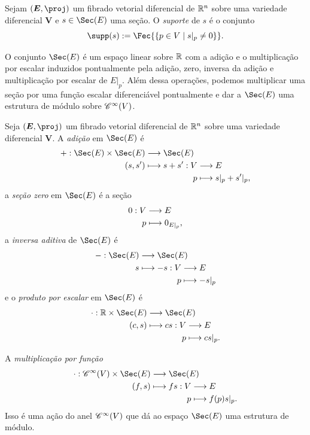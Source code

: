 \begin{defi}
Sejam $(\bm E,\proj)$ um fibrado vetorial diferencial de $\mathbb{R}^n$ sobre uma variedade diferencial $\bm V$ e $s \in \Sec(E)$ uma seção. O \emph{suporte} de $s$ é o conjunto
	\begin{equation*}
	\supp (s) := \Fec{\set{p \in V}{s|_p \neq 0}}.
	\end{equation*}
\end{defi}

O conjunto $\Sec(E)$ é um espaço linear sobre $\mathbb{R}$ com a adição e o multiplicação por escalar induzidos pontualmente pela adição, zero, inversa da adição e multiplicação por escalar de $E|_p$. Além dessa operações, podemos multiplicar uma seção por uma função escalar diferenciável pontualmente e dar a $\Sec(E)$ uma estrutura de módulo sobre $\mathscr{C}^\infty(V)$.

\begin{defi}
Seja $(\bm E,\proj)$ um fibrado vetorial diferencial de $\mathbb{R}^n$ sobre uma variedade diferencial $\bm V$. A \emph{adição} em $\Sec(E)$ é
	\begin{align*}
	\func{+}{\Sec(E) \times \Sec(E)}{\Sec(E)}{(s,s')}{
	\begin{aligned}[t]
	\func{s+s'}{V}{E}{p}{s|_p + s'|_p,}
	\end{aligned}
	}
	\end{align*}
a \emph{seção zero} em $\Sec(E)$ é a seção
	\begin{align*}
	\func{0}{V}{E}{p}{0_{E|_p}},
	\end{align*}
a \emph{inversa aditiva} de $\Sec(E)$ é
	\begin{align*}
	\func{-}{\Sec(E)}{\Sec(E)}{s}{
	\begin{aligned}[t]
	\func{-s}{V}{E}{p}{-s|_p}
	\end{aligned}
	}
	\end{align*}
e o \emph{produto por escalar} em $\Sec(E)$ é
	\begin{align*}
	\func{\cdot}{\R \times \Sec(E)}{\Sec(E)}{(c,s)}{
	\begin{aligned}[t]
	\func{cs}{V}{E}{p}{cs|_p.}
	\end{aligned}
	}
	\end{align*}

A \emph{multiplicação por função}
	\begin{align*}
	\func{\cdot}{\cont^\infty(V) \times \Sec(E)}{\Sec(E)}{(f,s)}{
		\begin{aligned}[t]
		\func{fs}{V}{E}{p}{f(p)s|_p.}
		\end{aligned}
	}	
	\end{align*}
Isso é uma ação do anel $\mathscr{C}^\infty(V)$ que dá ao espaço $\Sec(E)$ uma estrutura de módulo.
\end{defi}


